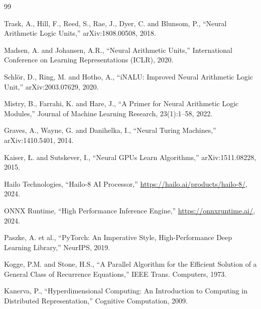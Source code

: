 \documentclass[11pt,a4paper]{article}
\begin{document}
\begin{thebibliography}{99}

 Trask, A., Hill, F., Reed, S., Rae, J., Dyer, C. and Blunsom, P., ``Neural Arithmetic Logic Units,'' arXiv:1808.00508, 2018.

 Madsen, A. and Johansen, A.R., ``Neural Arithmetic Units,'' International Conference on Learning Representations (ICLR), 2020.

 Schl\"or, D., Ring, M. and Hotho, A., ``iNALU: Improved Neural Arithmetic Logic Unit,'' arXiv:2003.07629, 2020.

 Mistry, B., Farrahi, K. and Hare, J., ``A Primer for Neural Arithmetic Logic Modules,'' Journal of Machine Learning Research, 23(1):1--58, 2022.

 Graves, A., Wayne, G. and Danihelka, I., ``Neural Turing Machines,'' arXiv:1410.5401, 2014.

 Kaiser, {\L}. and Sutskever, I., ``Neural GPUs Learn Algorithms,'' arXiv:1511.08228, 2015.

 Hailo Technologies, ``Hailo-8 AI Processor,'' \url{https://hailo.ai/products/hailo-8/}, 2024.

 ONNX Runtime, ``High Performance Inference Engine,'' \url{https://onnxruntime.ai/}, 2024.

 Paszke, A. et al., ``PyTorch: An Imperative Style, High-Performance Deep Learning Library,'' NeurIPS, 2019.

 Kogge, P.M. and Stone, H.S., ``A Parallel Algorithm for the Efficient Solution of a General Class of Recurrence Equations,'' IEEE Trans. Computers, 1973.

 Kanerva, P., ``Hyperdimensional Computing: An Introduction to Computing in Distributed Representation,'' Cognitive Computation, 2009.

\end{thebibliography}
\end{document}
